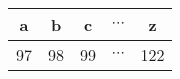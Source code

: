 \begin{tabular}{|c|c|c|c|c|}
\hline
a & b & c & $\cdots$ & z \\
\hline
97 & 98 & 99 & $\cdots$ & 122 \\
\hline
\end{tabular}